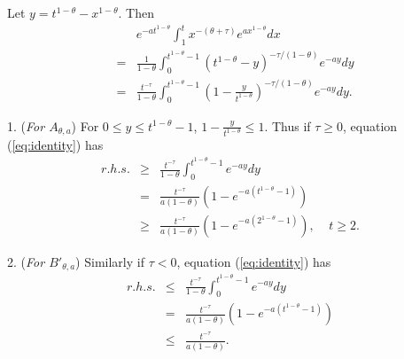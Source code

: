 \documentclass[twoside,twocolumn,journal]{IEEEtran}
\newenvironment{pf}[1][Proof]{\medskip\noindent\hspace{1em}{\itshape #1: }}{\hspace*{\fill}~\QED\par\endtrivlist\medskip}
\newcommand{\DS}{\displaystyle}
\begin{document}
\begin{pf} Let $y=t^{1-\theta} - x^{1-\theta}$. Then
\begin{eqnarray}
& & e^{-at^{1-\theta}} \int_1^t x^{-(\theta+\tau)} e^{ax^{1-\theta}} d x  \label{eq:identity}\\
& = & \frac{1}{1-\theta} \int_0^{t^{1-\theta}-1} (t^{1-\theta}-y)^{-\tau/(1-\theta)} e^{-a y} d y \nonumber \\
& = & \frac{t^{-\tau}}{1-\theta} \int_0^{t^{1-\theta}-1} \left(1-\frac{y}{t^{1-\theta}}\right)^{-\tau/(1-\theta)} e^{-a y} d y. \nonumber
\end{eqnarray}

1. (\emph{For $A_{\theta,a}$})
For $0\leq y \leq t^{1-\theta}-1$, $\DS 1-\frac{y}{t^{1-\theta}}\leq 1$. Thus if $\tau\geq 0$, equation (\ref{eq:identity}) has
\begin{eqnarray*}
r.h.s. & \geq & \frac{t^{-\tau}}{1-\theta} \int_0^{t^{1-\theta}-1} e^{-a y} d y \\
& = & \frac{t^{-\tau}}{a(1-\theta)}(1-e^{-a(t^{1-\theta}-1)}) \\
& \geq & \frac{t^{-\tau}}{a(1-\theta)}(1-e^{-a(2^{1-\theta}-1)}), \ \ \ \ \ \mbox{$t\geq 2$}.
\end{eqnarray*}

2. (\emph{For $B'_{\theta,a}$}) Similarly if $\tau<0$, equation (\ref{eq:identity}) has
\begin{eqnarray*}
r.h.s. & \leq & \frac{t^{-\tau}}{1-\theta} \int_0^{t^{1-\theta}-1} e^{-a y} d y \\
&  = & \frac{t^{-\tau}}{a(1-\theta)}(1-e^{-a(t^{1-\theta}-1)}) \\
& \leq & \frac{t^{-\tau}}{a(1-\theta)}.
\end{eqnarray*}


\end{pf}
\end{document}
